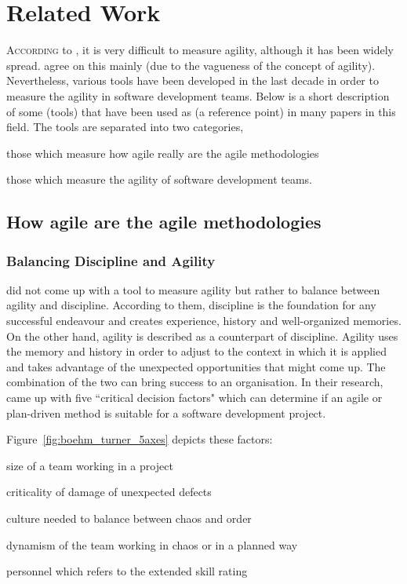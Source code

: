 \chapter{Related Work}\label{ch:related_work}

\lettrine[lines=4, loversize=-0.1, lraise=0.1]{A}{ccording} to \citet{yauch}, it is very difficult to measure agility, although it has been widely spread. \citet{tsourveloudis} agree on this mainly (due to the vagueness of the concept of agility). Nevertheless, various tools have been developed in the last decade in order to measure the agility in software development teams. Below is a short description of some (tools) that have been used as (a  reference point) in many papers in this field. The tools are separated into two categories, 
\begin{inparaenum} [a\upshape)]
\item those which measure how agile really are the agile methodologies
\item those which measure the agility of software development teams.
\end{inparaenum}


\section{How agile are the agile methodologies}

\subsection{Balancing Discipline and Agility}
\citet{1231450} did not come up with a tool to measure agility but rather to balance between agility and discipline. According to them, discipline is the foundation for any successful endeavour and creates experience, history and well-organized memories. On the other hand, agility is described as a counterpart of discipline. Agility uses the memory and history in order to adjust to the context in which it is applied and takes advantage of the unexpected opportunities that might come up. The combination of the two can bring success to an organisation. In their research, \citet{1231450} came up with five ``critical decision factors" which can determine if an agile or plan-driven method is suitable for a software development project.

Figure~\ref{fig:boehm_turner_5axes} depicts these factors:
\begin{inparaenum} [a\upshape)]
\item size of a team working in a project
\item criticality of damage of unexpected defects
\item culture needed to balance between chaos and order
\item dynamism of the team working in chaos or in a planned way
\item personnel which refers to the extended \citet{cockburn2002agile} skill rating %
\end{inparaenum}

